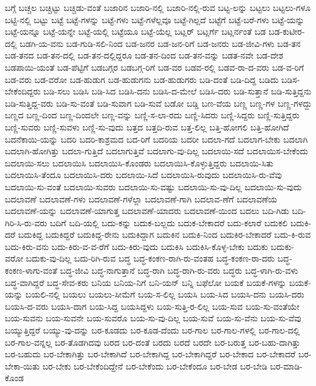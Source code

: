 {ಬಗ್ಗೆ
ಬಚ್ಚಲ
ಬಚ್ಚಿಟ್ಟು
ಬಚ್ಚಿಡು-ವಂತೆ
ಬಜಾರಿನ
ಬಜಾರಿ-ನಲ್ಲಿ
ಬಜಾರಿ-ನಲ್ಲಿ-ರುವ
ಬಟ್ಟ-ಲನ್ನು
ಬಟ್ಟಲು
ಬಟ್ಟಲು-ಗಳೂ
ಬಟ್ಟಿ-ನಲ್ಲಿ
ಬಟ್ಟು
ಬಟ್ಟೆ
ಬಟ್ಟೆ-ಗಳನ್ನು
ಬಟ್ಟೆ-ಗಳು
ಬಟ್ಟೆ-ಗಳೆಲ್ಲವೂ
ಬಟ್ಟೆ-ಗಿಲ್ಲದೆ
ಬಟ್ಟೆಗೆ
ಬಟ್ಟೆ-ಬರೆ-ಗಳು
ಬಟ್ಟೆ-ಯನ್ನು
ಬಟ್ಟೆ-ಯನ್ನೂ
ಬಟ್ಟೆ-ಯನ್ನೇ
ಬಟ್ಟೆ-ಯಲ್ಲಿ
ಬಟ್ಟೆಯೂ
ಬಟ್ಟೆ-ಯೆಲ್ಲ
ಬಟ್ಲರ್
ಬಟ್ಲರ್ಗೆ
ಬಟ್ಲರ್ನಂತೆ
ಬಡ
ಬಡ-ಕುಟೀರ-ದಲ್ಲಿ
ಬಡಗಿ-ಯ-ವನು
ಬಡ-ಗುಡಿ-ಸಲಿ-ನಿಂದ
ಬಡ-ಜನರ
ಬಡ-ಜನ-ರಿಗೆ
ಬಡ-ಜನರು
ಬಡ-ಜೀವಿ-ಗಳು
ಬಡ-ತನ
ಬಡ-ತನದ
ಬಡ-ತನ-ದಲ್ಲಿ
ಬಡ-ತನ-ದಲ್ಲಿದ್ದರೂ
ಬಡ-ತನ-ದಿಂದ
ಬಡ-ತನ-ವನ್ನು
ಬಡತ-ನವೇ
ಬಡ-ದೇಶ
ಬಡಪಾಯಿ-ಯಂತೆ
ಬಡ-ಪೆಟ್ಟಿಗೆ
ಬಡಬಗ್ಗರ
ಬಡಬಗ್ಗ-ರಿಗೆ
ಬಡ-ವರ
ಬಡವ-ರಲ್ಲಿ
ಬಡವ-ರಾ-ದ-ವರು
ಬಡ-ವ-ರಿಗೆ
ಬಡ-ವರು
ಬಡ-ವರೋ
ಬಡ-ಹುಡುಗ
ಬಡ-ಹುಡುಗನು
ಬಡ-ಹುಡುಗರು
ಬಡಿ-ದಂತೆ
ಬಡಿ-ದಿದ್ದ
ಬಡಿದು
ಬಡಿಸ-ಬೇಕೆಂದಿದ್ದರು
ಬಡಿ-ಸಲು
ಬಡಿಸಿ
ಬಡಿ-ಸಿದ
ಬಡಿಸಿ-ದನು
ಬಡಿಸಿ-ದ-ಮೇಲೆ
ಬಡಿಸಿ-ದರು
ಬಡಿ-ಸುತ್ತಾನೆ
ಬಡಿ-ಸುತ್ತಿದ್ದನು
ಬಡಿ-ಸುತ್ತಿದ್ದ-ವರು
ಬಡಿ-ಸು-ವಂತೆ
ಬಡಿ-ಸುವಾಗ
ಬಡಿ-ಸುವೆ
ಬಡೋ
ಬಡ್ಡಿ
ಬಣ-ವೆಯ
ಬಣ್ಣ
ಬಣ್ಣ-ಗಳ
ಬಣ್ಣ-ಗಳದ್ದು
ಬಣ್ಣದ
ಬಣ್ಣ-ದಿಂದ
ಬಣ್ಣ-ದಿಂದಲೇ
ಬಣ್ಣ-ವನ್ನು
ಬಣ್ಣಿ-ಸ-ಲಾ-ರದು
ಬಣ್ಣಿ-ಸಿದರು
ಬಣ್ಣಿ-ಸಿದ್ದರು
ಬಣ್ಣಿ-ಸುತ್ತಿದ್ದರು
ಬಣ್ಣಿ-ಸುವರು
ಬಣ್ಣಿ-ಸುವಳು
ಬಣ್ಣಿ-ಸು-ವುದು
ಬತ್ತದ
ಬತ್ತದಿ-ರುವ
ಬತ್ತ-ಲಿಲ್ಲ
ಬತ್ತಿ-ಹೋಗಲಿ
ಬತ್ತಿ-ಹೋಗಿದೆ
ಬದನೆಕಾಯಿ-ಯನ್ನು
ಬದರಿ
ಬದರಿ-ಕಾಶ್ರಮದ
ಬದ-ರಿಗೆ
ಬದರಿಯ
ಬದರೀ
ಬದಲಾ-ಗದೆ
ಬದಲಾಗ-ಬೇಕು
ಬದಲಾಗಿ
ಬದಲಾಗಿ-ಹೋಗಿತ್ತು
ಬದಲಾ-ಗುತ್ತಿದೆ
ಬದಲಾಗುತ್ತಿವೆ
ಬದಲಾಗು-ವು-ದಿಲ್ಲ
ಬದಲಾಯಿ-ಸದೆ
ಬದಲಾಯಿಸ-ಬೇಕೆಂದು
ಬದಲಾಯಿ-ಸಲು
ಬದಲಾಯಿಸಿ
ಬದಲಾಯಿಸಿ-ಕೊಂಡರು
ಬದಲಾಯಿಸಿ-ಕೊಳ್ಳುತ್ತಿದ್ದರು
ಬದಲಾಯಿ-ಸಿತು
ಬದಲಾಯಿಸಿ-ತೆಂದೂ
ಬದಲಾಯಿಸಿ-ದರು
ಬದಲಾಯಿ-ಸಿದೆ
ಬದಲಾಯಿಸಿ-ರುವುದು
ಬದಲಾಯಿಸಿ-ರು-ವೆವು
ಬದಲಾಯಿ-ಸು-ವಂತೆ
ಬದಲಾಯಿ-ಸುವರು
ಬದಲಾಯಿ-ಸು-ವಷ್ಟು
ಬದಲಾಯಿ-ಸು-ವು-ದಿಲ್ಲ
ಬದಲಾಯಿ-ಸು-ವುದು
ಬದಲಾವಣೆ
ಬದಲಾವಣೆ-ಗಳು
ಬದಲಾವಣೆ-ಗಳೆಲ್ಲಾ
ಬದಲಾವಣೆ-ಗಾಗಿ
ಬದಲಾವ-ಣೆಗೆ
ಬದಲಾವಣೆಯ
ಬದಲಾವಣೆ-ಯನ್ನು
ಬದಲಾವಣೆ-ಯಾಗುತ್ತ
ಬದಲಾವಣೆ-ಯಾದರು
ಬದಲಾವಣೆ-ಯಿಂದ
ಬದಲು
ಬದಿ-ಗಿಡು
ಬದಿ-ಗಿರಿ-ಸಿ-ರು-ವರು
ಬದಿಗೆ
ಬದಿ-ಯಲ್ಲಿ
ಬದು-ಕನ್ನು
ಬದುಕ-ಬಲ್ಲದು
ಬದುಕ-ಬೇಕಾದರೆ
ಬದು-ಕಲಾರೆ
ಬದುಕಲಿ
ಬದುಕಿ-ದರೆ
ಬದುಕಿದ್ದ
ಬದುಕಿದ್ದರೆ
ಬದುಕಿದ್ದ-ರೇನು
ಬದುಕಿದ್ದಾಗ
ಬದುಕಿನ
ಬದುಕಿ-ನಿಂದ
ಬದುಕಿರ-ಬೇಕಾದರೆ
ಬದು-ಕಿ-ರುವ
ಬದು-ಕಿರು-ವನು
ಬದು-ಕಿರು-ವ-ವ-ರೆಗೆ
ಬದು-ಕಿರು-ವುದು
ಬದುಕಿಸಿ
ಬದುಕಿಸಿ-ಕೊಳ್ಳ-ಬೇಕು
ಬದುಕು
ಬದುಕು-ವರೋ
ಬದುಕು-ವು-ದಿಲ್ಲ
ಬದು-ರಿಗಿ-ರುವ
ಬದ್ಧ
ಬದ್ಧ-ಕಂಕಣ-ರಾಗಿ-ರು-ವಂತಹ
ಬದ್ಧ-ಕಂಕಣ-ರಾ-ದರು
ಬದ್ಧ-ಕಂಕಣ-ಳಾಗು-ವಂತೆ
ಬದ್ಧ-ಜೀವಿ
ಬದ್ಧ-ನಾಗುತ್ತಾನೆ
ಬದ್ಧ-ರಾಗಿ
ಬದ್ಧ-ರಾಗಿ-ರು-ವರು
ಬದ್ಧರು
ಬದ್ಧ-ಳಾಗಿ-ರು-ವಳು
ಬದ್ಧ-ವಾಗಿದ್ದರೆ
ಬದ್ಧ-ಸೇವ-ಕರು
ಬನಿಯ
ಬನಿಯ-ನಿಗೆ
ಬನಿ-ಯನ್
ಬನ್ನಿ
ಬಫೆಲೋ
ಬಯಕೆ
ಬಯಕೆ-ಗಳನ್ನು
ಬಯಕೆ-ಯನ್ನು
ಬಯಲಿ-ನಲ್ಲಿ
ಬಯಲು
ಬಯಲು-ಸೀಮೆಗೆ
ಬಯ-ಸ-ಲಿಲ್ಲ
ಬಯಸಿ
ಬಯ-ಸಿದ
ಬಯಸಿ-ದನು
ಬಯಸಿ-ದರು
ಬಯಸಿ-ದ-ವರು
ಬಯಸಿ-ದಾಗ
ಬಯ-ಸಿದ್ದ
ಬಯಸಿದ್ದಳು
ಬಯ-ಸುತ್ತಿ-ರ-ಲಿಲ್ಲ
ಬಯ-ಸುವ
ಬಯ-ಸು-ವಂತೆಯೇ
ಬಯ-ಸುವನು
ಬಯ-ಸುವನೇ
ಬಯ-ಸುವರೊ
ಬಯ-ಸು-ವು-ದಿಲ್ಲ
ಬಯ-ಸುವೆ
ಬಯ-ಸು-ವೆನು
ಬಯ-ಸು-ವೆವು
ಬಯ್ಯುತ್ತಿದ್ದರೆ
ಬಯ್ಯು-ವು-ದನ್ನು
ಬರ-ಕೂಡದು
ಬರ-ಕೂಡ-ದೆಂದು
ಬರ-ಗಾಲ
ಬರ-ಗಾಲ-ಗಳಲ್ಲಿ
ಬರ-ಗಾಲ-ದಲ್ಲಿ
ಬರ-ಗಾಲ-ವನ್ನಲ್ಲ
ಬರ-ತೊಡಗಿದವು
ಬರದ
ಬರ-ದಂತೆ
ಬರದು
ಬರದೆ
ಬರದೇ
ಬರ-ಬರುತ್ತ
ಬರ-ಬಹು-ದಾಗಿತ್ತು
ಬರ-ಬಹುದು
ಬರ-ಬೇಕಾಗಿತ್ತು
ಬರ-ಬೇಕಾಗಿದೆ
ಬರ-ಬೇಕಾಗಿದ್ದ
ಬರ-ಬೇಕಾಗಿದ್ದರೆ
ಬರ-ಬೇಕಾದ
ಬರ-ಬೇಕಾದರೆ
ಬರ-ಬೇಕಾ-ಯಿತು
ಬರ-ಬೇಕು
ಬರ-ಬೇಕೆಂದಿದ್ದೇನೆ
ಬರ-ಬೇಕೆಂದು
ಬರ-ಬೇಕೆಂದೂ
ಬರ-ಬೇಡ
ಬರ-ಬೇಡಿ
ಬರ-ಮಾಡಿ-ಕೊಂಡ
}
